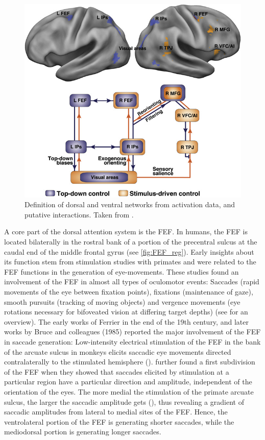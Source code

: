 \documentclass[a4paper, 12pt]{scrreprt}
\begin{document}
\begin{figure}[H]
	\includegraphics[scale=0.4]{img/attentionnetworks.png}
	\caption[Dorsal and ventral attention networks]
	{\small{Definition of dorsal and ventral networks from activation data, and putative interactions. Taken from \textcite{corbetta2008reorienting}.}}
	\label{fig:Networks}
\end{figure}



A core part of the dorsal attention system is the FEF. In humans, the FEF is located bilaterally in the rostral bank of a portion of the precentral sulcus at the caudal end of the middle frontal gyrus (see \ref{fig:FEF_reg}). Early insights about its function stem from stimulation studies with primates and were related to the FEF functions in the generation of eye-movements. These studies found an involvement of the FEF in almost all types of oculomotor events: Saccades (rapid movements of the eye between fixation points), fixations (maintenance of gaze), smooth pursuits (tracking of moving objects) and vergence movements (eye rotations necessary for bifoveated vision at differing target depths) (see \textcite{krauzlis2014eye} for an overview). The early works of Ferrier in the end of the 19th century, and later works by Bruce and colleagues (1985) reported the major involvement of the FEF in saccade generation: Low-intensity electrical stimulation of the FEF in the bank of the arcuate sulcus in monkeys elicits saccadic eye movements directed contralaterally to the stimulated hemisphere (\cite{tehovnik2000eye}). \textcite{bruce1985primate} further found a first subdivision of the FEF when they showed that saccades elicited by stimulation at a particular region have a particular direction and amplitude, independent of the orientation of the eyes. The more medial the stimulation of the primate arcuate sulcus, the larger the saccadic amplitude gets (\cite{bruce1985primate}), thus revealing a gradient of saccadic amplitudes from lateral to medial sites of the FEF. Hence, the ventrolateral portion of the FEF is generating shorter saccades, while the mediodorsal portion is generating longer saccades. 
\end{document}
